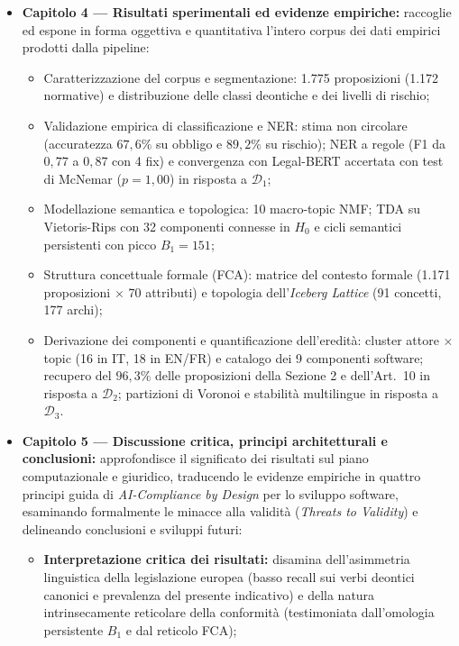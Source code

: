 \documentclass[12pt,a4paper,oneside]{report}
\begin{document}
\begin{itemize}
    \item \textbf{Capitolo 4 — Risultati sperimentali ed evidenze empiriche:} raccoglie ed espone in forma oggettiva e quantitativa l'intero corpus dei dati empirici prodotti dalla pipeline:
    \begin{itemize}
        \item Caratterizzazione del corpus e segmentazione: 1.775 proposizioni (1.172 normative) e distribuzione delle classi deontiche e dei livelli di rischio;
        \item Validazione empirica di classificazione e NER: stima non circolare (accuratezza $67{,}6\%$ su obbligo e $89{,}2\%$ su rischio); NER a regole (F1 da $0{,}77$ a $0{,}87$ con 4 fix) e convergenza con Legal-BERT accertata con test di McNemar ($p = 1{,}00$) in risposta a $\mathcal{D}_1$;
        \item Modellazione semantica e topologica: 10 macro-topic NMF; TDA su Vietoris-Rips con 32 componenti connesse in $H_0$ e cicli semantici persistenti con picco $B_1 = 151$;
        \item Struttura concettuale formale (FCA): matrice del contesto formale (1.171 proposizioni $\times$ 70 attributi) e topologia dell'\textit{Iceberg Lattice} (91 concetti, 177 archi);
        \item Derivazione dei componenti e quantificazione dell'eredità: cluster attore $\times$ topic (16 in IT, 18 in EN/FR) e catalogo dei 9 componenti software; recupero del $96{,}3\%$ delle proposizioni della Sezione 2 e dell'Art.~10 in risposta a $\mathcal{D}_2$; partizioni di Voronoi e stabilità multilingue in risposta a $\mathcal{D}_3$.
    \end{itemize}
    \item \textbf{Capitolo 5 — Discussione critica, principi architetturali e conclusioni:} approfondisce il significato dei risultati sul piano computazionale e giuridico, traducendo le evidenze empiriche in quattro principi guida di \textit{AI-Compliance by Design} per lo sviluppo software, esaminando formalmente le minacce alla validità (\textit{Threats to Validity}) e delineando conclusioni e sviluppi futuri:
    \begin{itemize}
        \item \textbf{Interpretazione critica dei risultati:} disamina dell'asimmetria linguistica della legislazione europea (basso recall sui verbi deontici canonici e prevalenza del presente indicativo) e della natura intrinsecamente reticolare della conformità (testimoniata dall'omologia persistente $B_1$ e dal reticolo FCA);

\end{itemize}
\end{itemize}
\end{document}
